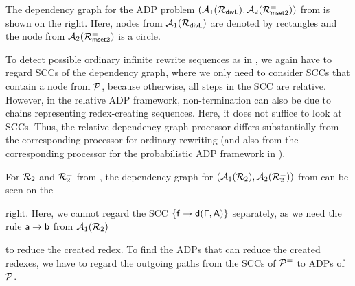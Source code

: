 \vspace*{-.8cm}
\begin{example}\label{ex:rel-dependency-graph}
    The dependency graph for the ADP problem $(\mathcal{A}_{1}(\mathcal{R}_{\mathsf{divL}}),
    \mathcal{A}_{2}(\mathcal{R}^{=}_{\mathsf{mset} 2}))$
    from  is shown on the right. 
    Here, nodes from $\mathcal{A}_{1}(\mathcal{R}_{\mathsf{divL}})$ are denoted by rectangles and the
    node from $\mathcal{A}_{2}(\mathcal{R}^{=}_{\mathsf{mset} 2})$ is a circle.
\end{example}

To detect possible ordinary infinite rewrite sequences as in ,
we again have to regard SCCs of the dependency graph,
where we only need to consider SCCs that contain a node from $\mathcal{P}$,
because otherwise, all steps in the SCC are relative.
However, in the relative ADP framework,
non-termination can also be due to chains representing redex-creating sequences.
Here,
it does not suffice to
look at SCCs.
Thus, the relative dependency graph processor differs substantially from the corresponding
processor for ordinary rewriting (and also from the corresponding processor for the
probabilistic ADP framework in \cite{FLOPS2024}). 

\begin{example}\label{ex:DepGraphRedexCreating}
    For $\mathcal{R}_2$ and $\mathcal{R}_2^=$ from ,
    the dependency graph for  $(\mathcal{A}_{1}(\mathcal{R}_2), \mathcal{A}_{2}(\mathcal{R}_2^{=}))$ from
     can be \pagebreak[2] seen on the

    \noindent
    \begin{minipage}[t]{9cm}
        right.
        Here, we cannot regard the SCC $\{\mathsf{f} \to \mathsf{d}(\mathsf{F},\mathsf{A})\}$ separately,
        as we need the rule  $\mathsf{a} \to \mathsf{b}$ from $\mathcal{A}_{1}(\mathcal{R}_2)$ \linebreak
    \end{minipage}
    \hspace*{0.05cm}
    \begin{minipage}[t]{2.5cm}
        \begin{center}
            \scriptsize
            \vspace*{-0.4cm}
        \end{center}
    \end{minipage}

    \vspace*{-0.3cm}
    \noindent
    to reduce the created redex.
    To find the ADPs that can reduce the created redexes,
    we have to regard the outgoing paths
    from the SCCs of $\mathcal{P}^=$  to ADPs of $\mathcal{P}$. 
\end{example}

